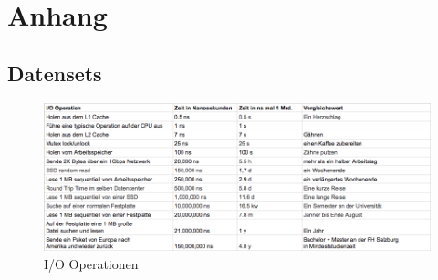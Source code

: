 \section*{Anhang}

\subsection*{Datensets}

\begin{figure}[!htb]
  \centering
  \includegraphics[width=16cm]{images/io_operations.png}
  \caption{
    I/O Operationen
  }
  \label{figure:syncron_vs_async}
\end{figure}